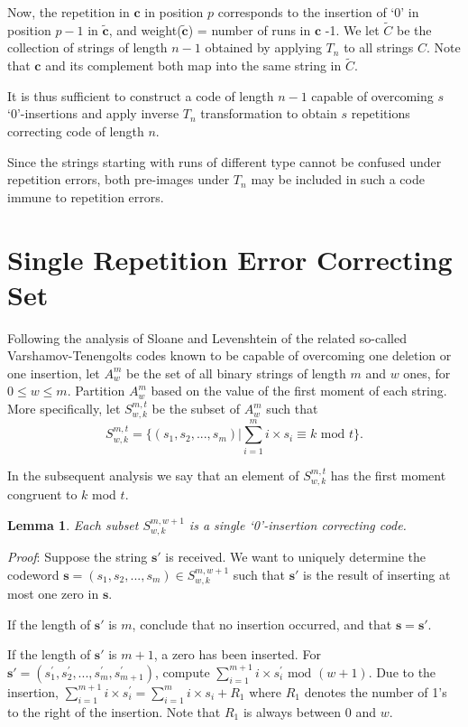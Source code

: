 \documentclass[12pt]{article} \pagestyle{plain} \topmargin
\newtheorem{lemma}{Lemma}
\begin{document}
Now, the repetition in $\mathbf{c}$ in position $p$ corresponds to
the insertion of `0' in position $p-1$ in $\mathbf{\tilde{c}}$,
and weight($\mathbf{\tilde{c}}$) = number of runs in $\mathbf{c}$
-1. We let $\tilde{C}$ be the collection of strings of length
$n-1$ obtained by applying $T_n$ to all strings $C$. Note that
$\mathbf{c}$ and its complement both map into the same string in
$\tilde{C}$.

It is thus sufficient to construct a code of length $n-1$ capable
of overcoming $s$ `0'-insertions and apply inverse $T_n$
transformation to obtain $s$ repetitions correcting code of length
$n$.

Since the strings starting with runs of different type cannot be
confused under repetition errors, both pre-images under $T_n$ may
be included in such a code immune to repetition errors.
\section{Single Repetition Error Correcting Set}\label{one}
Following the analysis of Sloane \cite{sloane:00} and Levenshtein
\cite{lev:66} of the related so-called Varshamov-Tenengolts codes
\cite{vt:65} known to be capable of overcoming one deletion or one
insertion, let $A_w^m$ be the set of all binary strings of length
$m$ and $w$ ones, for $0 \leq w \leq m$. Partition $A_w^m$ based on
the value of the first moment of each string. More specifically, let
$S_{w,k}^{m,t}$ be the subset of $A_w^m$ such that
\begin{equation}\label{s1f}S_{w,k}^{m,t}=\{(s_1,s_2,...,s_m)| \sum_{i=1}^m
i \times s_i \equiv k \text{ mod } t\}.\end{equation}

In the subsequent analysis we say that an element of $S_{w,k}^{m,t}$
has the first moment congruent to $k$ mod $t$.

\begin{lemma}Each subset $S_{w,k}^{m,w+1}$ is a single `0'-insertion correcting
code.\end{lemma} \textit{Proof}: Suppose the string $\mathbf{s'}$ is
received. We want to uniquely determine the codeword
$\mathbf{s}=(s_1,s_2,...,s_m) \in S_{w,k}^{m,w+1}$ such that
$\mathbf{s'}$ is the result of inserting at most one zero in
$\mathbf{s}$.

If the length of $\mathbf{s'}$ is $m$, conclude that no insertion
occurred, and that $\mathbf{s}=\mathbf{s'}$.

If the length of $\mathbf{s'}$ is $m+1$, a zero has been inserted.
For $\mathbf{s'}=(s_1^{'},s_2^{'},...,s_m^{'},s_{m+1}^{'})$,
compute $\sum_{i=1}^{m+1} i \times s_i^{'} \text{ mod } (w+1)$.
Due to the insertion, $\sum_{i=1}^{m+1} i \times s_i^{'}=
\sum_{i=1}^{m} i \times s_i + R_1$ where $R_1$ denotes the number
of 1's to the right of the insertion. Note that $R_1$ is always
between $0$ and $w$.
\end{document}
